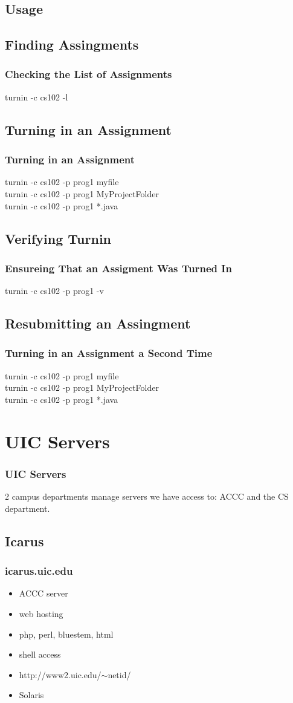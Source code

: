 \documentclass[hyperref={pdfpagelabels=false}]{beamer}
\begin{document}
\subsection{Usage}
\subsection{Finding Assingments}
\frame
{
    \frametitle{Checking the List of Assignments}
	turnin -c cs102 -l
}
\subsection{Turning in an Assignment}
\frame
{
    \frametitle{Turning in an Assignment}
	turnin -c cs102 -p prog1 myfile\\
	turnin -c cs102 -p prog1 MyProjectFolder\\
	turnin -c cs102 -p prog1 *.java
}
\subsection{Verifying Turnin}
\frame
{
    \frametitle{Ensureing That an Assigment Was Turned In}
	turnin -c cs102 -p prog1 -v

}
\subsection{Resubmitting an Assingment}
\frame
{
    \frametitle{Turning in an Assignment a Second Time}
	turnin -c cs102 -p prog1 myfile\\
	turnin -c cs102 -p prog1 MyProjectFolder\\
	turnin -c cs102 -p prog1 *.java\\
	
}
\section{UIC Servers}
\frame
{
    \frametitle{UIC Servers}
    2 campus departments manage servers we have access to: ACCC and the CS department.
}
\subsection{Icarus}
\frame
{
    \frametitle{icarus.uic.edu}
    \begin{itemize}
    \item{ACCC server}
    \item{web hosting}
    \item{php, perl, bluestem, html}
    \item{shell access}
    \item{http://www2.uic.edu/$\sim$netid/}
    \item{Solaris}
    \end{itemize}
}
\end{document}
